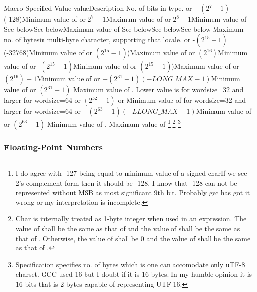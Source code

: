 {\starttable[|l|l|l|l| ]
\HL
\VL Macro \VL Specified Value\VL {} value\VL Description\VL\SR
\HL
\VL{}\VL No. of bits in  type.\VL\SR
\HL
\VL {} or $-(2^7-1)$\note[1]\VL
(-128)\VL Minimum value of \VL\SR
\HL
\VL {} or $2^7-1$\VL Maximum value of
  \VL\SR
\HL
\VL{} or $2^8-1$\VL Minimum value of
  \VL\SR
\HL
\VL{}\VL See below\note[2]\VL See below\note[2]\VL Maximum value of
  \VL\SR
\HL
\VL{}\VL See below\note[2]\VL See below\note[2]\VL See below\note[2]\VL\SR
\HL
\VL{}\VL Maximum no. of bytes\note[3] in\VL\SR
\VL\VL\VL\VL multi-byte character, supporting that locale.\VL\SR
\HL
\VL {} or -$(2^{15}-1)$\VL(-32768)\VL Minimum value
of \VL\SR
\HL
\VL {} or $(2^{15}-1)$)\VL Maximum value
of \VL\SR
\HL
\VL {} or $(2^{16})$\VL Minimum value
of \VL\SR
\HL
\VL {} or -$(2^{15}-1)$\VL{}\VL Minimum value
of \VL\SR
\HL
\VL {} or $(2^{15}-1)$)\VL Maximum value
of \VL\SR
\HL
\VL {} or $(2^{16})-1$\VL Minimum value
of \VL\SR
\HL
\VL {} or $−(2^{31} − 1)$\VL$(-LONG\_MAX - 1)$\VL Minimum value
of \VL\SR
\HL
\VL {} or $(2^{31}-1)$
\VL Maximum value of . Lower value is \VL\SR
\VL\VL{} \VL for wordsize=32 and larger for
wordsize=64\VL\SR
\HL
\VL {} or $(2^{32}-1)$ or \VL Minimum value
of \VL\SR
\VL\VL{}\VL for wordsize=32 and larger for
wordsize=64\VL\SR
\HL
\VL {} or $−(2^{63} − 1)$\VL$(-LLONG\_MAX - 1)$\VL Minimum value
of \VL\SR
\HL
\VL {} or $(2^{63}-1)$
\VL Minimum value of .\VL\SR
\HL
\VL {}\VL Maximum value
of \VL\SR
\HL
\stoptable}
\footnote[1]{I do agree with -127 being equal to minimum value of a \type
{signed char}If we see 2's complement form then it should be -128. I
know that -128 can not be represented without MSB as most significant
9th bit. Probably gcc has got it wrong or my interpretation is incomplete.}
\footnote[2]{Char is internally treated as 1-byte integer when used in
  an expression. The value of  shall be the same as that of
   and the value of  shall be the same as that of
  . Otherwise, the value of  shall be 0 and the
  value of  shall be the same as that of .}
\footnote[3]{Specification specifies no. of bytes which is one can
  accomodate only uTF-8 charset. GCC used 16 but I doubt if it is
  16 bytes. In my humble opinion it is 16-bits that is 2 bytes capable
  of representing UTF-16.}
\subsubsection{Floating-Point Numbers}

